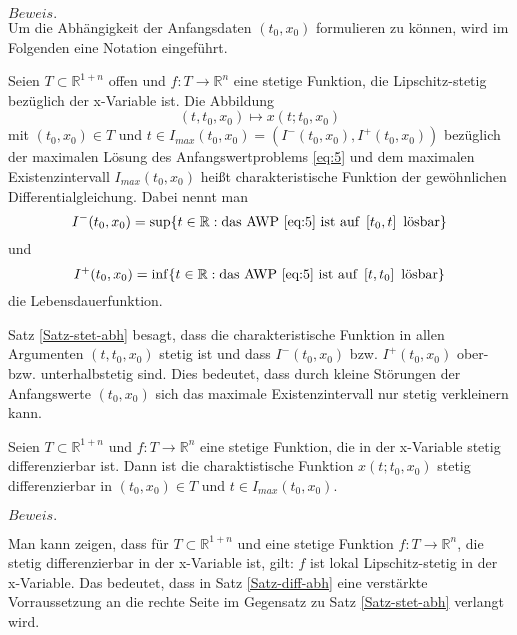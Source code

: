 $Beweis.$ \cite[67,68]{beckGewohnlicheDifferentialgleichungen2018}\\
Um die Abhängigkeit der Anfangsdaten $(t_0,x_0)$ formulieren zu können, wird im Folgenden eine Notation eingeführt.
\begin{definition}
    Seien $T \subset \mathbb{R}^{1+n}$ offen und $f:T \rightarrow \mathbb{R}^{n}$ eine stetige Funktion, die
    Lipschitz-stetig bezüglich der x-Variable ist. Die Abbildung
    \[
        (t, t_0, x_0) \mapsto x(t; t_0, x_0)
    \]
    mit $(t_0, x_0)\in T$ und $t \in I_{max}(t_0,x_0) = \left( I^{-}(t_0,x_0), I^{+}(t_0,x_0) \right)$ bezüglich der
    maximalen Lösung des Anfangswertproblems \eqref{eq:5} und dem maximalen Existenzintervall $I_{max}(t_0,x_0)$ heißt
    charakteristische Funktion der gewöhnlichen Differentialgleichung.
    Dabei nennt man 
    \[
        I^{-}(t_0,x_0)=\sup\{ t\in\mathbb{R}: \text{das AWP \eqref{eq:5} ist auf } \left[ t_0, t \right] \text{ lösbar}\}
    \] und
    \[
        I^{+}(t_0,x_0)=\inf\{ t\in\mathbb{R}: \text{das AWP \eqref{eq:5} ist auf } \left[ t, t_0 \right] \text{ lösbar}\}
    \]
    die Lebensdauerfunktion.
\end{definition}
Satz \ref{Satz-stet-abh} besagt, dass die charakteristische Funktion in allen Argumenten $(t, t_0, x_0)$ stetig ist und
dass $I^{-}(t_0,x_0)$ bzw. $I^{+}(t_0,x_0)$ ober- bzw. unterhalbstetig sind. Dies bedeutet, dass durch kleine Störungen der
Anfangswerte $(t_0,x_0)$ sich das maximale Existenzintervall nur stetig verkleinern kann.
\begin{satz}
    \label{Satz-diff-abh}
    Seien $T \subset \mathbb{R}^{1+n}$ und $f:T \rightarrow \mathbb{R}^{n}$ eine stetige Funktion, die in der x-Variable
    stetig differenzierbar ist. Dann ist die charaktistische Funktion $x(t; t_0, x_0)$ stetig differenzierbar in
    $(t_0, x_0) \in T$ und $t \in I_{max}(t_0, x_0)$.
\end{satz}
$Beweis.$ \cite[69,70]{beckGewohnlicheDifferentialgleichungen2018}\\
\begin{bem}
    Man kann zeigen, dass für $T \subset \mathbb{R}^{1+n}$ und eine stetige Funktion $f:T \rightarrow \mathbb{R}^{n}$,
    die stetig differenzierbar in der x-Variable ist, gilt: $f$ ist lokal Lipschitz-stetig in der x-Variable.
    Das bedeutet, dass in Satz \ref{Satz-diff-abh} eine verstärkte Vorraussetzung an die rechte Seite
    im Gegensatz zu Satz \ref{Satz-stet-abh} verlangt wird.
\end{bem}